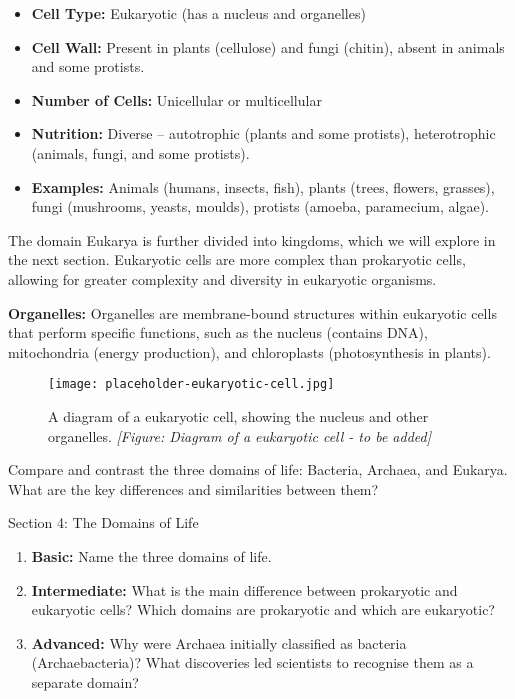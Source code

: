 \begin{itemize}
    \item \textbf{Cell Type:} Eukaryotic (has a nucleus and organelles)
    \item \textbf{Cell Wall:} Present in plants (cellulose) and fungi (chitin), absent in animals and some protists.
    \item \textbf{Number of Cells:} Unicellular or multicellular
    \item \textbf{Nutrition:} Diverse – autotrophic (plants and some protists), heterotrophic (animals, fungi, and some protists).
    \item \textbf{Examples:} Animals (humans, insects, fish), plants (trees, flowers, grasses), fungi (mushrooms, yeasts, moulds), protists (amoeba, paramecium, algae).
\end{itemize}

The domain Eukarya is further divided into kingdoms, which we will explore in the next section.  Eukaryotic cells are more complex than prokaryotic cells, allowing for greater complexity and diversity in eukaryotic organisms.

\begin{marginnote}
\textbf{Organelles:} Organelles are membrane-bound structures within eukaryotic cells that perform specific functions, such as the nucleus (contains DNA), mitochondria (energy production), and chloroplasts (photosynthesis in plants).
\end{marginnote}

\begin{figure}
\centering
\texttt{[image: placeholder-eukaryotic-cell.jpg]}
\caption{A diagram of a eukaryotic cell, showing the nucleus and other organelles. \textit{[Figure: Diagram of a eukaryotic cell - to be added]}}
\end{figure}


\begin{stopandthink}
Compare and contrast the three domains of life: Bacteria, Archaea, and Eukarya. What are the key differences and similarities between them?
\end{stopandthink}


\begin{tieredquestions}{Section 4: The Domains of Life}
\begin{enumerate}
    \item \textbf{Basic:} Name the three domains of life.
    \item \textbf{Intermediate:} What is the main difference between prokaryotic and eukaryotic cells? Which domains are prokaryotic and which are eukaryotic?
    \item \textbf{Advanced:}  Why were Archaea initially classified as bacteria (Archaebacteria)? What discoveries led scientists to recognise them as a separate domain?
\end{enumerate}
\end{tieredquestions}


